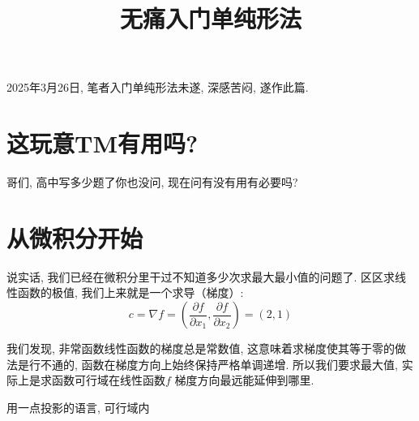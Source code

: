 \documentclass{article}
\title{无痛入门单纯形法}
\author{}
\begin{document}
\maketitle

2025年3月26日, 笔者入门单纯形法未遂, 深感苦闷, 遂作此篇.

\section{这玩意TM有用吗?}
哥们, 高中写多少题了你也没问, 现在问有没有用有必要吗?

\section{从微积分开始}

说实话, 我们已经在微积分里干过不知道多少次求最大最小值的问题了. 区区求线性函数的极值, 我们上来就是一个求导（梯度）:
\[
    c = \nabla f =\left( \frac{\partial f}{\partial x_1},
    \frac{\partial f}{\partial x_2} \right) = (2,1)
\]

我们发现, 非常函数线性函数的梯度总是常数值, 这意味着求梯度使其等于零的做法是行不通的,
函数在梯度方向上始终保持严格单调递增. 所以我们要求最大值, 实际上是求函数可行域在线性函数\(f\) 梯度方向最远能延伸到哪里.

用一点投影的语言, 可行域内
\end{document}
